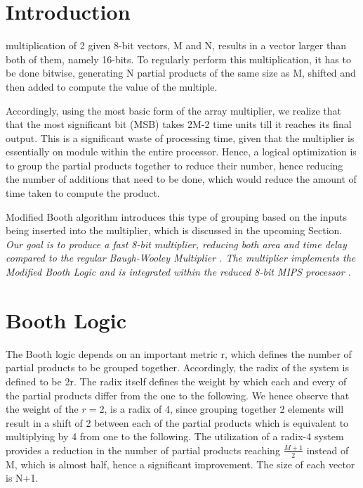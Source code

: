 \documentclass[journal]{IEEEtran}
\begin{document}
\section{Introduction}
multiplication of 2 given 8-bit vectors, M and N, results in a vector larger than both of them, namely 16-bits. To regularly perform this multiplication, it has to be done bitwise, generating N partial products of the same size as M, shifted and then added to compute the value of the multiple.

Accordingly, using the most basic form of the array multiplier, we realize that that the most significant bit (MSB) takes 2M-2 time units till it reaches its final output. This is a significant waste of processing time, given that the multiplier is essentially on module within the entire processor. Hence, a logical optimization is to group the partial products together to reduce their number, hence reducing the number of additions that need to be done, which would reduce the amount of time taken to compute the product.

Modified Booth algorithm \cite{mcs} introduces this type of grouping based on 
the inputs being inserted into the multiplier, which is discussed in the upcoming Section.
\emph{Our goal is to produce a fast 8-bit multiplier, reducing both area and time delay compared to the 
regular Baugh-Wooley Multiplier \cite{cash}. The multiplier implements the Modified 
Booth Logic and is integrated within the reduced 8-bit MIPS processor \cite{tb}}.

\section{Booth Logic}

The Booth logic depends on an important metric r, which defines the number of partial products to be grouped together. Accordingly, the radix of the system is defined to be 2r. The radix itself defines the weight by which each and every of the partial products differ from the one to the following. We hence observe that the weight of the $r=2$, is a radix of 4, since grouping together 2 elements will result in a shift of 2 between each of the partial products which is equivalent to multiplying by 4 from one to the following. The utilization of a radix-4 system provides a reduction in the number of partial products reaching $\frac{M+1}{2}$
instead of M, which is almost half, hence a significant improvement. The size of each vector is N+1.
\end{document}
